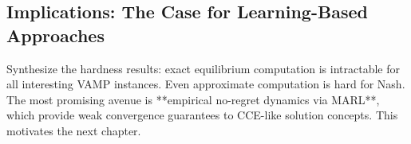 \subsection{Implications: The Case for Learning-Based Approaches}
Synthesize the hardness results: exact equilibrium computation is intractable for all interesting VAMP instances. Even approximate computation is hard for Nash. The most promising avenue is **empirical no-regret dynamics via MARL**, which provide weak convergence guarantees to CCE-like solution concepts. This motivates the next chapter.
